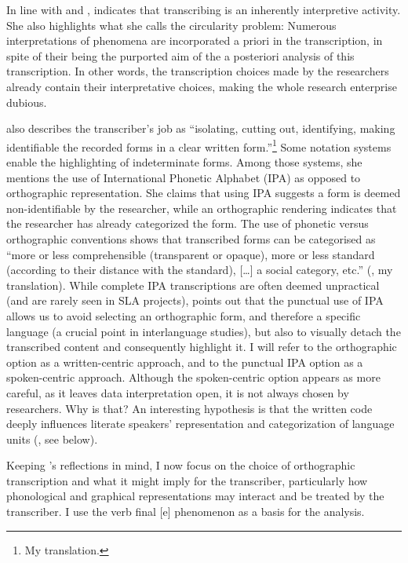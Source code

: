 \documentclass[output=paper,colorlinks,citecolor=brown,modfonts,nonflat]{../langscibook}
\begin{document}
In line with \citet{Ochs1979,Jefferson1996} and \citet{Saturno2015}, \citet{Mondada2000} indicates that transcribing is an inherently interpretive activity. She also highlights what she calls the circularity problem: Numerous interpretations of phenomena are incorporated a priori in the transcription, in spite of their being the purported aim of the a posteriori analysis of this transcription. In other words, the transcription choices made by the researchers already contain their interpretative choices, making the whole research enterprise dubious.

\citet[8]{Mondada2000} also describes the transcriber’s job as “isolating, cutting out, identifying, making identifiable the recorded forms in a clear written form.”\footnote{{My translation.}} Some notation systems enable the highlighting of indeterminate forms. Among those systems, she mentions the use of International Phonetic Alphabet (IPA) as opposed to orthographic representation. She claims that using IPA suggests a form is deemed non-identifiable by the researcher, while an orthographic rendering indicates that the researcher has already categorized the form. The use of phonetic versus orthographic conventions shows that transcribed forms can be categorised as “more or less comprehensible (transparent or opaque), more or less standard (according to their distance with the standard), […] a social category, etc.” (\citealt[8]{Mondada2000}, my translation). While complete IPA transcriptions are often deemed unpractical (and are rarely seen in SLA projects), \citeauthor{Mondada2000} points out that the punctual use of IPA allows us to avoid selecting an orthographic form, and therefore a specific language (a crucial point in interlanguage studies), but also to visually detach the transcribed content and consequently highlight it. I will refer to the orthographic option as a written-centric approach, and to the punctual IPA option as a spoken-centric approach. Although the spoken-centric option appears as more careful, as it leaves data interpretation open, it is not always chosen by researchers. Why is that? An interesting hypothesis is that the written code deeply influences literate speakers’ representation and categorization of language units (\citealt{Jaffré2006}, see below).

Keeping \citeauthor{Mondada2000}’s reflections in mind, I now focus on the choice of orthographic transcription and what it might imply for the transcriber, particularly how phonological and graphical representations may interact and be treated by the transcriber. I use the verb final [e] phenomenon as a basis for the analysis.
\end{document}
